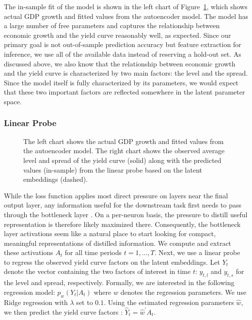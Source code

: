 \documentclass{article}
\theoremstyle{plain}
\theoremstyle{definition}
\theoremstyle{remark}
\begin{document}
The in-sample fit of the model is shown in the left chart of Figure~\ref{fig-dl-results}, which shows actual GDP growth and fitted values from the autoencoder
model. The model has a large number of free parameters and captures the relationship between economic growth and the yield curve reasonably well, as expected. Since our primary goal is not out-of-sample prediction accuracy but feature extraction for inference, we use all of the available data instead of reserving a hold-out set. As discussed above, we also know that the relationship between economic growth and the yield curve is characterized by two main factors: the level and the spread. Since the model itself is fully characterized by its parameters, we would expect that these two important factors are reflected somewhere in the latent parameter space. 

\subsubsection{Linear Probe}\label{linear-probe}

\begin{figure}


\caption{\label{fig-dl-results}The left chart shows the actual GDP growth
and fitted values from the autoencoder model. The right chart shows the
observed average level and spread of the yield curve (solid) along with
the predicted values (in-sample) from the linear probe based on the latent embeddings
(dashed).}

\end{figure}%

While the loss function applies most direct pressure on layers near the final output layer, any information useful for the downstream task first needs to pass through the bottleneck layer \citep{alain2018understanding}. On a per-neuron basis, the pressure to distill useful representation is therefore likely maximized there. Consequently, the bottleneck layer activations seem like a natural place to start looking for compact, meaningful representations of distilled information.  We compute and extract these activations \(A_t\) for all time periods \(t=1,...,T\). Next, we use a linear probe to regress the observed
yield curve factors on the latent embeddings. Let \(Y_t\) denote the vector containing the two factors of interest in time \(t\): \(y_{t,l}\) and \(y_{t,s}\) for the level and spread, respectively. Formally, we are interested in the following regression model: \(p_{w}(Y_t|A_t)\) where \(w\) denotes the regression
parameters. We use Ridge regression with \(\lambda\) set to \(0.1\). Using the estimated regression parameters \(\hat{w}\), we then predict the yield curve factors%
: \(\hat{Y}_t=\hat{w}^{\prime}A_t\).
\end{document}
